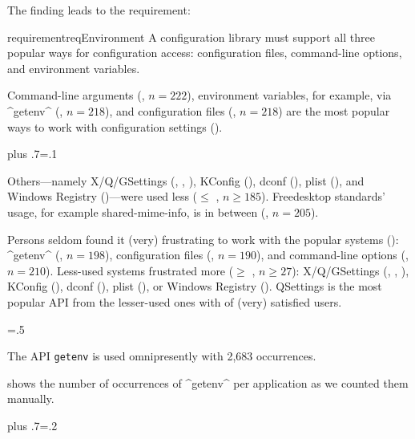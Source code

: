 The finding leads to the requirement:

\begin{restatable}{requirement}{reqEnvironment}
A configuration library must support all three popular ways for configuration access:
configuration files, command-line options, and environment variables.
\end{restatable}

\methodQuestion{}
Command-line arguments (, $n=222$), environment variables, for example, via ^getenv^ (, $n=218$), and configuration files (, $n=218$) are the most popular ways to work with configuration settings ().%
{\parfillskip=0pt plus .7\textwidth \emergencystretch=.1\textwidth \par}

Others---namely X/Q/GSettings (, , ), KConfig (), dconf (), plist (), and Windows Registry ()---were used less ($\leq$ , $n\geq185$). %
Freedesktop standards' usage, for example shared-mime-info, is in between (, $n=205$).

Persons seldom found it (very) frustrating to work with the popular systems ():
^getenv^ (, $n=198$), configuration files (, $n=190$), and command-line options (, $n=210$).
Less-used systems frustrated more ($\geq$ , $n\geq 27$):
X/Q/GSettings (, , ), KConfig (), dconf (), plist (), or Windows Registry ().
QSettings is the most popular API from the lesser-used ones with  of (very) satisfied users.%
{\parfillskip=0pt \emergencystretch=.5\textwidth \par}

\begin{finding}
The API \texttt{getenv} is used omnipresently with 2,683 occurrences.
\end{finding}

\methodSource{}
 shows the number of occurrences of ^getenv^ per application as we counted them manually.%
{\parfillskip=0pt plus .7\textwidth \emergencystretch=.2\textwidth \par}


